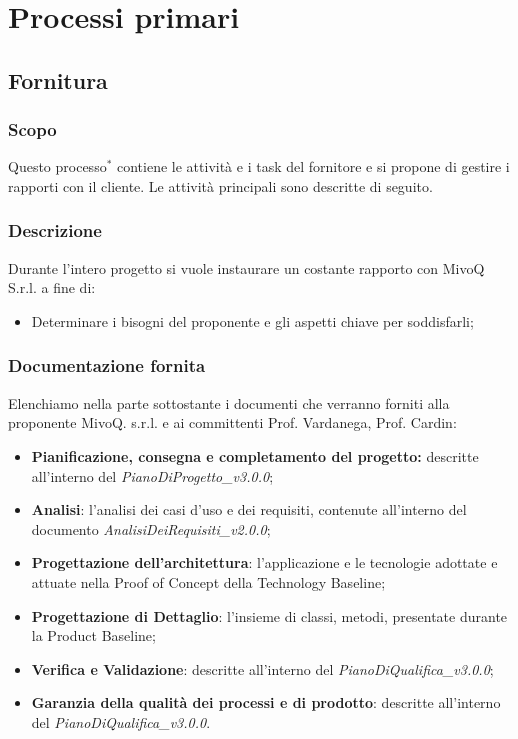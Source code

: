 \documentclass[11pt,a4paper]{article}
\begin{document}
{	
	\section{Processi primari}
	\subsection{Fornitura}
	\subsubsection{Scopo}
	Questo processo$^*$ contiene le attività e i task del fornitore e si propone di gestire i rapporti con il cliente. Le attività principali sono descritte di seguito.
	
	\subsubsection{Descrizione}
	Durante l’intero progetto si vuole instaurare un costante rapporto con MivoQ S.r.l. a fine di:
	\begin{itemize}
		\item Determinare i bisogni del proponente e gli aspetti chiave per soddisfarli;
		\end{itemize}
	
	\subsubsection{Documentazione fornita}
	Elenchiamo nella parte sottostante i documenti che verranno forniti alla proponente MivoQ. s.r.l. e ai committenti Prof. Vardanega, Prof. Cardin: 
	\begin{itemize}
	\item \textbf{Pianificazione, consegna e completamento del progetto:} descritte all’interno del \textit{PianoDiProgetto\_v3.0.0};
	\item \textbf{Analisi}: l’analisi dei casi d’uso e dei requisiti, contenute all’interno del documento \textit{AnalisiDeiRequisiti\_v2.0.0};
	\item \textbf{Progettazione dell’architettura}: l’applicazione e le tecnologie
	adottate e attuate nella Proof of Concept della Technology Baseline;
	\item\textbf{ Progettazione di Dettaglio}: l’insieme di classi, metodi, presentate durante la Product Baseline;
	\item \textbf{Verifica e Validazione}: descritte all’interno del \textit{PianoDiQualifica\_v3.0.0};
	\item \textbf{Garanzia della qualità dei processi e di prodotto}: descritte all’interno del \textit{PianoDiQualifica\_v3.0.0}.
	\end{itemize}
	
}
\end{document}
